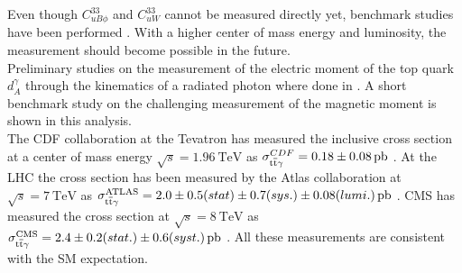 Even though $C_{uB\phi}^{33}$ and $C_{uW}^{33}$ cannot be measured directly yet, benchmark studies have been performed \cite{Hermanns:1292768}. With a higher center of mass energy and luminosity, the measurement should become possible in the future. \\
Preliminary studies on the measurement of the electric moment of the top quark $d_A^{\gamma}$ through the kinematics of a radiated photon where done in \cite{Backes}. A short benchmark study on the challenging measurement of the magnetic moment is shown in this analysis. \\
The CDF collaboration at the Tevatron has measured the inclusive \ttgamma cross section at a center of mass energy $\sqrt{s} = \SI{1.96}{\tera \electronvolt}$  as $\sigma_{\ttgamma}^{CDF} = \SI{0.18\pm0.08}{\pico \barn}$ \cite{Aaltonen:2011sp}. At the LHC the \ttgamma cross section has been measured by the Atlas collaboration at $\sqrt{s} = \SI{7}{\tera \electronvolt}$ as $\sigma_{\ttgamma}^{\mathrm{ATLAS}} = \SI[parse-numbers=false]{2.0 \pm 0.5 (stat) \pm 0.7 (sys.) \pm 0.08 (lumi.)}{\pico \barn}$ \cite{ATLAS-CONF-2011-122}. CMS has measured the \ttgamma cross section at $\sqrt{s} = \SI{8}{\tera \electronvolt}$ as $\sigma_{\ttgamma}^{\mathrm{CMS}} = \SI[parse-numbers=false]{2.4 \pm 0.2(stat.) \pm 0.6(syst.)}{\pico \barn}$ \cite{CMS-PAS-TOP-13-011}. All these measurements are consistent with the SM expectation. 